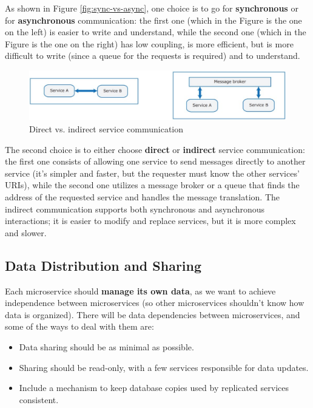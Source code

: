 As shown in Figure \ref{fig:sync-vs-async}, one choice is to go for \textbf{synchronous} or for \textbf{asynchronous} communication: the first one (which in the Figure is the one on the left) is easier to write and understand, while the second one (which in the Figure is the one on the right) has low coupling, is more efficient, but is more difficult to write (since a queue for the requests is required) and to understand.

\begin{figure} [H]
    \centering
    \includegraphics[width=1\textwidth]{images/Microservices/direct-vs-ind.PNG}
    \caption{Direct vs. indirect service communication}
    \label{fig:direct-vs-ind}
\end{figure} 

The second choice is to either choose \textbf{direct} or \textbf{indirect} service communication: the first one consists of allowing one service to send messages directly to another service (it's simpler and faster, but the requester must know the other services' URIs), while the second one utilizes a message broker or a queue that finds the address of the requested service and handles the message translation. The indirect communication supports both synchronous and asynchronous interactions; it is easier to modify and replace services, but it is more complex and slower.

\subsection{Data Distribution and Sharing}

Each microservice should \textbf{manage its own data}, as we want to achieve independence between microservices (so other microservices shouldn't know how data is organized). There will be data dependencies between microservices, and some of the ways to deal with them are:
\begin{itemize}
    \item Data sharing should be as minimal as possible.
    \item Sharing should be read-only, with a few services responsible for data updates.
    \item Include a mechanism to keep database copies used by replicated services consistent.
\end{itemize}

